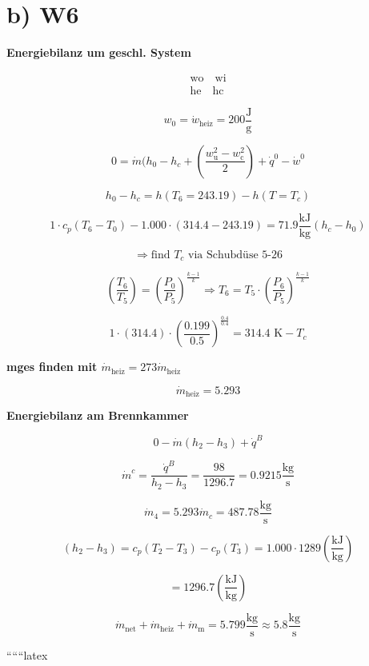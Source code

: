 \section*{b) W6}

\textbf{Energiebilanz um geschl. System}

\[
\begin{array}{c}
\boxed{\text{wo}} \quad \boxed{\text{wi}} \\
\boxed{\text{he}} \quad \boxed{\text{hc}}
\end{array}
\]

\[
w_0 = \dot{w}_{\text{heiz}} = 200 \frac{\text{J}}{\text{g}}
\]

\[
0 = \dot{m} (h_0 - h_c + \left( \frac{w_{\text{u}}^2 - w_{\text{c}}^2}{2} \right) + \dot{q}^0 - \dot{w}^0
\]

\[
h_0 - h_c = h(T_6 = 243.19) - h(T = T_c)
\]

\[
1 \cdot c_p (T_6 - T_0) - 1.000 \cdot (314.4 - 243.19) = 71.9 \frac{\text{kJ}}{\text{kg}} \left( h_c - h_0 \right)
\]

\[
\Rightarrow \text{find } T_c \text{ via Schubdüse 5-26}
\]

\[
\left( \frac{T_6}{T_5} \right) = \left( \frac{P_0}{P_5} \right)^{\frac{k-1}{k}} \Rightarrow T_6 = T_5 \cdot \left( \frac{P_6}{P_5} \right)^{\frac{k-1}{k}}
\]

\[
1 \cdot (314.4) \cdot \left( \frac{0.199}{0.5} \right)^{\frac{0.4}{0.4}} = 314.4 \text{ K} - T_c
\]

\textbf{mges finden mit $\dot{m}_{\text{heiz}} = 273 \dot{m}_{\text{heiz}}$}

\[
\dot{m}_{\text{heiz}} = 5.293
\]

\textbf{Energiebilanz am Brennkammer}

\[
0 - \dot{m} (h_2 - h_3) + \dot{q}^B
\]

\[
\dot{m}^c = \frac{\dot{q}^B}{h_2 - h_3} = \frac{98}{1296.7} = 0.9215 \frac{\text{kg}}{\text{s}}
\]

\[
\dot{m}_4 = 5.293 \dot{m}_c = 487.78 \frac{\text{kg}}{\text{s}}
\]

\[
(h_2 - h_3) = c_p (T_2 - T_3) - c_p (T_3) = 1.000 \cdot 1289 \left( \frac{\text{kJ}}{\text{kg}} \right)
\]

\[
= 1296.7 \left( \frac{\text{kJ}}{\text{kg}} \right)
\]

\[
\dot{m}_{\text{net}} + \dot{m}_{\text{heiz}} + \dot{m}_{\text{m}} = 5.799 \frac{\text{kg}}{\text{s}} \approx 5.8 \frac{\text{kg}}{\text{s}}
\]

``````latex


